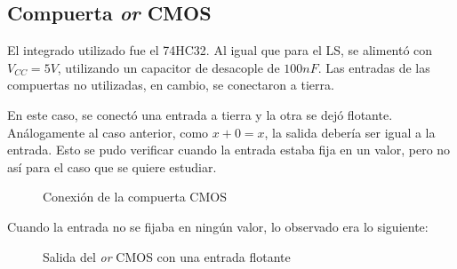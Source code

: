 \documentclass[../../e3_tp2_main.tex]{subfiles}
\begin{document}
\subsection{Compuerta \textit{or} CMOS}

El integrado utilizado fue el 74HC32. Al igual que para el LS, se aliment\'o con $V_{CC}=5V$, utilizando un capacitor de desacople de $100nF$. Las entradas de las compuertas no utilizadas, en cambio, se conectaron a tierra.\par

En este caso, se conect\'o una entrada a tierra y la otra se dej\'o flotante. An\'alogamente al caso anterior, como $x + 0 = x$, la salida deber\'ia ser igual a la entrada. Esto se pudo verificar cuando la entrada estaba fija en un valor, pero no as\'i para el caso que se quiere estudiar.\par

\begin{figure}[H]
	\centering
	\caption{Conexi\'on de la compuerta CMOS}
\end{figure}

Cuando la entrada no se fijaba en ning\'un valor, lo observado era lo siguiente: 

\begin{figure}[H]
	\centering
	\caption{Salida del \textit{or} CMOS con una entrada flotante}
\end{figure}
\end{document}
